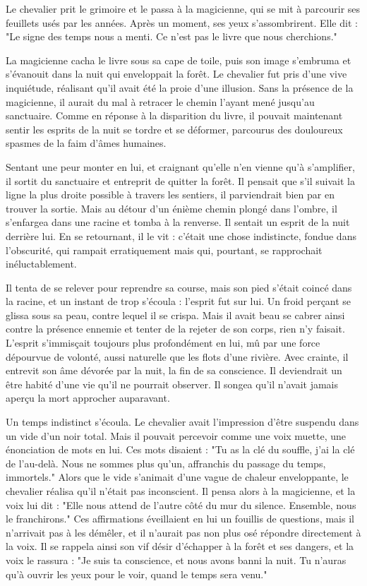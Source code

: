 \documentclass[a4paper,11pt, openany]{book}
\begin{document}
Le chevalier prit le grimoire et le passa à la magicienne, qui se mit à parcourir ses feuillets usés par les années. Après un moment, ses yeux s'assombrirent. Elle dit :
"Le signe des temps nous a menti. Ce n'est pas le livre que nous cherchions."

La magicienne cacha le livre sous sa cape de toile, puis son image s'embruma et s'évanouit dans la nuit qui enveloppait la forêt.
Le chevalier fut pris d'une vive inquiétude, réalisant qu'il avait été la proie d'une illusion. 
Sans la présence de la magicienne, il aurait du mal à retracer le chemin l'ayant mené jusqu'au sanctuaire. 
Comme en réponse à la disparition du livre, il pouvait maintenant sentir les esprits de la nuit se tordre et se déformer, 
parcourus des douloureux spasmes de la faim d'âmes humaines. 

Sentant une peur monter en lui, et craignant qu'elle n'en vienne qu'à s'amplifier, 
il sortit du sanctuaire et entreprit de quitter la forêt.
Il pensait que s'il suivait la ligne la plus droite possible à travers les sentiers, il parviendrait bien par en trouver la sortie.
Mais au détour d'un énième chemin plongé dans l'ombre, il s'enfargea dans une racine et tomba à la renverse.
Il sentait un esprit de la nuit derrière lui. En se retournant, il le vit : c'était une chose indistincte, fondue dans l'obscurité, 
qui rampait erratiquement mais qui, pourtant, se rapprochait inéluctablement. 

Il tenta de se relever pour reprendre sa course, mais son pied s'était coincé dans la racine, et un instant de trop s'écoula : l'esprit fut sur lui.
Un froid perçant se glissa sous sa peau, contre lequel il se crispa. Mais il avait beau se cabrer ainsi contre la présence ennemie et tenter de la rejeter de son corps, rien n'y faisait.
L'esprit s'immisçait toujours plus profondément en lui, mû par une force dépourvue de volonté, aussi naturelle que les flots d'une rivière.
Avec crainte, il entrevit son âme dévorée par la nuit, la fin de sa conscience. Il deviendrait un être habité d'une vie qu'il ne pourrait observer.
Il songea qu'il n'avait jamais aperçu la mort approcher auparavant.

Un temps indistinct s'écoula. Le chevalier avait l'impression d'être suspendu dans un vide d'un noir total. Mais il pouvait percevoir comme une voix muette, une énonciation de mots en lui.
Ces mots disaient : "Tu as la clé du souffle, j'ai la clé de l'au-delà. Nous ne sommes plus qu'un, affranchis du passage du temps, immortels."
Alors que le vide s'animait d'une vague de chaleur enveloppante, le chevalier réalisa qu'il n'était pas inconscient. 
Il pensa alors à la magicienne, et la voix lui dit : "Elle nous attend de l'autre côté du mur du silence. Ensemble, nous le franchirons."
Ces affirmations éveillaient en lui un fouillis de questions, mais il n'arrivait pas à les démêler, et il n'aurait pas non plus osé répondre directement à la voix.
Il se rappela ainsi son vif désir d'échapper à la forêt et ses dangers, et la voix le rassura : "Je suis ta conscience, et nous avons banni la nuit. Tu n'auras qu'à ouvrir les yeux pour le voir, quand le temps sera venu."
\end{document}
